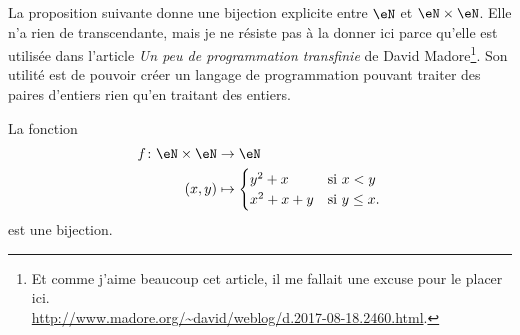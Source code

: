 \begin{normaltext}
	La proposition suivante donne une bijection explicite entre \( \eN\) et \( \eN\times \eN\). Elle n'a rien de transcendante, mais je ne résiste pas à la donner ici parce qu'elle est utilisée dans l'article \emph{Un peu de programmation transfinie} de David Madore\footnote{Et comme j'aime beaucoup cet article, il me fallait une excuse pour le placer ici.\\ \url{http://www.madore.org/~david/weblog/d.2017-08-18.2460.html}.}. Son utilité est de pouvoir créer un langage de programmation pouvant traiter des paires d'entiers rien qu'en traitant des entiers.
\end{normaltext}
\begin{proposition}        \label{PROPooLPKUooAlsYJg}
	La fonction
	\begin{equation}
		\begin{aligned}
			f\colon \eN\times \eN & \to \eN                               \\
			(x,y)                 & \mapsto \begin{cases}
				                                y^2+x   & \text{si } x<y      \\
				                                x^2+x+y & \text{si } y\leq x.
			                                \end{cases}
		\end{aligned}
	\end{equation}
	est une bijection.
\end{proposition}

